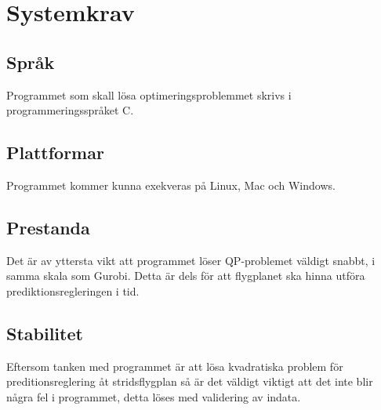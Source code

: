 \section{Systemkrav}

\subsection{Språk}
Programmet som skall lösa optimeringsproblemmet skrivs i programmeringsspråket C.

\subsection{Plattformar}
Programmet kommer kunna exekveras på Linux, Mac och Windows.

\subsection{Prestanda}
Det är av yttersta vikt att programmet löser QP-problemet väldigt snabbt, i samma skala som Gurobi. Detta är dels för att flygplanet ska hinna utföra prediktionsregleringen i tid.

\subsection{Stabilitet}
Eftersom tanken med programmet är att lösa kvadratiska problem för preditionsreglering åt stridsflygplan så är det väldigt viktigt att det inte blir några fel i programmet, detta löses med validering av indata.